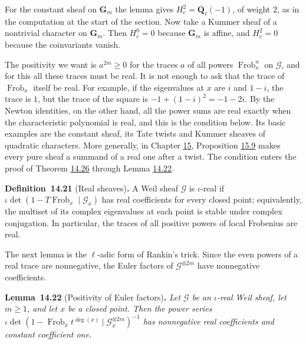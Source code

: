 \documentclass[11pt]{article}
\newenvironment{bpstatement}[2]{\par\addvspace{0.6\baselineskip}\noindent\textbf{#1}#2\textbf{.}\enspace\ignorespaces}
  {\par\addvspace{0.4\baselineskip}}
\newenvironment{bpstatementit}[2]{\begin{bpstatement}{#1}{#2}\itshape\ignorespaces}{\end{bpstatement}}
\begin{document}
\label{bp106}%
For the constant sheaf on \(\mathbf G_m\) the lemma gives \(H^2_c=\overline{\mathbf Q}_\ell(-1)\), of weight \(2\), as in the computation at the start of the section. Now take a Kummer sheaf of a nontrivial character on \(\mathbf G_m\). Then \(H^0_c=0\) because \(\mathbf G_m\) is affine, and \(H^2_c=0\) because the coinvariants vanish.

The positivity we want is \(a^{2m}\ge0\) for the traces \(a\) of all powers \(\operatorname{Frob}_x^n\) on \(\mathcal G\), and for this all these traces must be real. It is not enough to ask that the trace of \(\operatorname{Frob}_x\) itself be real. For example, if the eigenvalues at \(x\) are \(i\) and \(1-i\), the trace is \(1\), but the trace of the square is \(-1+(1-i)^2=-1-2i\). By the Newton identities, on the other hand, all the power sums are real exactly when the characteristic polynomial is real, and this is the condition below. Its basic examples are the constant sheaf, its Tate twists and Kummer sheaves of quadratic characters. More generally, in Chapter \hyperref[bp122]{15}, Proposition \hyperref[bp148]{15.9} makes every pure sheaf a summand of a real one after a twist. The condition enters the proof of Theorem \hyperref[bp120]{14.26} through Lemma \hyperref[bp109]{14.22}.

\label{bp107}%
\begin{bpstatement}{Definition~14.21}{ (Real sheaves)}
A Weil sheaf \(\mathcal G\) is \(\iota\)-real if \(\iota\det(1-T\operatorname{Frob}_x\mid\mathcal G_{\bar x})\) has real coefficients for every closed point; equivalently, the multiset of its complex eigenvalues at each point is stable under complex conjugation.  In particular, the traces of all positive powers of local Frobenius are real.
\end{bpstatement}

\label{bp108}%
The next lemma is the \(\ell\)-adic form of Rankin's trick. Since the even powers of a real trace are nonnegative, the Euler factors of \(\mathcal G^{\otimes2m}\) have nonnegative coefficients.

\label{bp109}%
\begin{bpstatementit}{Lemma~14.22}{ (Positivity of Euler factors)}
Let \(\mathcal G\) be an \(\iota\)-real Weil sheaf, let \(m\ge1\), and let \(x\) be a closed point. Then the power series \(\iota\det(1-\operatorname{Frob}_xt^{\deg(x)}\mid\mathcal G^{\otimes2m}_{\bar x})^{-1}\) has nonnegative real coefficients and constant coefficient one.
\end{bpstatementit}
\end{document}
